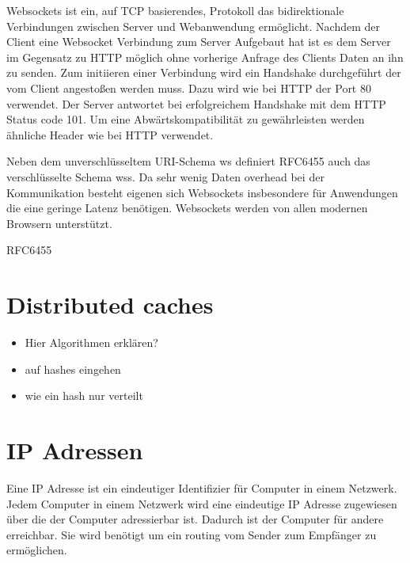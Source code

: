 Websockets ist ein, auf TCP basierendes, Protokoll das bidirektionale Verbindungen zwischen Server und Webanwendung ermöglicht. Nachdem der Client eine Websocket Verbindung zum Server Aufgebaut hat ist es dem Server im Gegensatz zu HTTP möglich ohne vorherige Anfrage des Clients Daten an ihn zu senden. Zum initiieren einer Verbindung wird ein Handshake durchgeführt der vom Client angestoßen werden muss. Dazu wird wie bei HTTP der Port 80 verwendet. Der Server antwortet bei erfolgreichem Handshake mit dem HTTP Status code 101. Um eine Abwärtskompatibilität zu gewährleisten werden ähnliche Header wie bei HTTP verwendet.

Neben dem unverschlüsseltem URI-Schema ws definiert RFC6455\cite{rfcWebsockets} auch das verschlüsselte Schema wss. Da  sehr wenig Daten overhead bei der Kommunikation besteht eigenen sich Websockets insbesondere für Anwendungen die eine geringe Latenz benötigen. Websockets werden von allen modernen Browsern unterstützt.

%
%
%
% 
%  


RFC6455\cite{rfcWebsockets}

\section{Distributed caches}
\begin{itemize}
	\item Hier Algorithmen erklären?
	\item auf hashes eingehen
	\item wie ein hash nur verteilt
\end{itemize}
\section{IP Adressen}
Eine IP Adresse ist ein eindeutiger Identifizier für Computer in einem Netzwerk. Jedem Computer in einem Netzwerk wird eine eindeutige IP Adresse zugewiesen über die der Computer adressierbar ist. Dadurch ist der Computer für andere erreichbar. Sie wird benötigt um ein routing vom Sender zum Empfänger zu ermöglichen. \cite{www}
